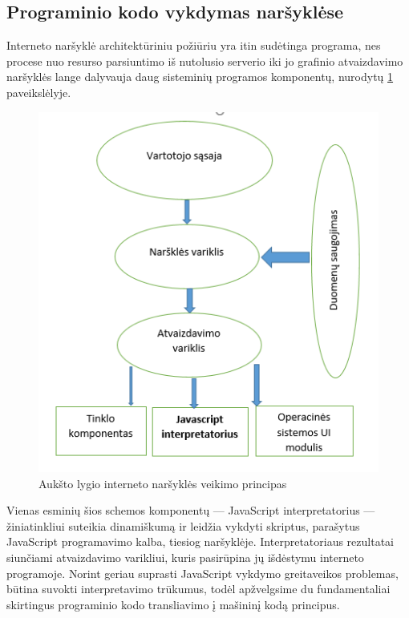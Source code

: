 \documentclass{VUMIFPSkursinis}
\begin{document}
\subsection{Programinio kodo vykdymas naršyklėse}
Interneto naršyklė architektūriniu požiūriu yra itin sudėtinga programa, nes procese nuo resurso parsiuntimo iš nutolusio serverio iki jo grafinio atvaizdavimo naršyklės lange dalyvauja daug sisteminių programos komponentų, nurodytų \ref{fig:browser_architecture} paveikslėlyje. 

\begin{figure}[h!]
  \begin{center}
  \includegraphics[scale=1]{naršyklės_architektūra.png}
  \end{center}
  \caption{Aukšto lygio interneto naršyklės veikimo principas \cite{MOR17}}
  \label{fig:browser_architecture}
\end{figure}

Vienas esminių šios schemos komponentų — JavaScript interpretatorius — žiniatinkliui suteikia dinamiškumą ir leidžia vykdyti skriptus, parašytus JavaScript programavimo kalba, tiesiog naršyklėje. Interpretatoriaus rezultatai siunčiami atvaizdavimo varikliui, kuris pasirūpina jų išdėstymu interneto programoje. \cite{MOR17} Norint geriau suprasti JavaScript vykdymo greitaveikos problemas, būtina suvokti interpretavimo trūkumus, todėl apžvelgsime du fundamentaliai skirtingus programinio kodo transliavimo į mašininį kodą principus.
\end{document}
